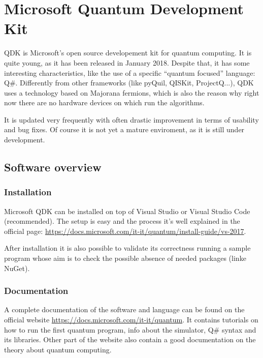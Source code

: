 
\chapter{Microsoft Quantum Development Kit}
\label{chp:qdk}

QDK is Microsoft's open source developement kit for quantum computing. It is quite young, as it has been released in January 2018. Despite that, it has some interesting characteristics, like the use of a specific ``quantum focused'' language: Q\#. Differently from  other frameworks (like pyQuil, QISKit, ProjectQ...), QDK uses a technology based on Majorana fermions, which is also the reason why right now there are no hardware devices on which run the algorithms. \cite{larose2019overview}

It is updated very frequently with often drastic improvement in terms of usability and bug fixes. Of course it is not yet a mature enviroment, as it is still under development.

\section{Software overview}

\subsection{Installation}

Microsoft QDK can be installed on top of Visual Studio or Visual Studio Code (recommended). The setup is easy and the process it's well explained in the official page: \url{https://docs.microsoft.com/it-it/quantum/install-guide/vs-2017}.

After installation it is also possible to validate its correctness running a sample program whose aim is to check the possible absence of needed packages (linke NuGet).

\subsection{Documentation}

A complete documentation of the software and language can be found on the official website \url{https://docs.microsoft.com/it-it/quantum}. It contains tutorials on how to run the first quantum program, info about the simulator, Q\# syntax and its libraries. Other part of the website also contain a good documentation on the theory about quantum computing.

